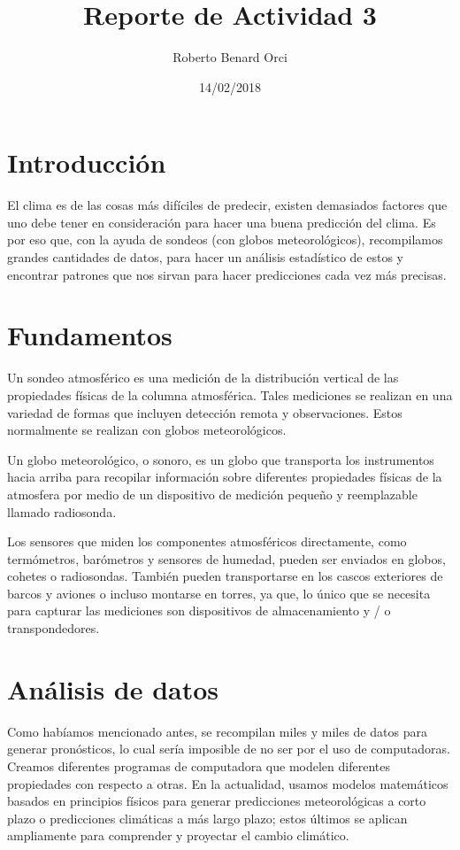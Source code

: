 \documentclass{article}
\title{Reporte de Actividad 3}
\author{Roberto Benard Orci}
\date{14/02/2018}
\begin{document}
\maketitle

\section{Introducción}
El clima es de las cosas más difíciles de predecir, existen demasiados factores que uno debe tener en consideración para hacer una buena predicción del clima. Es por eso que, con la ayuda de sondeos (con globos meteorológicos), recompilamos grandes cantidades de datos, para hacer un análisis estadístico de estos y encontrar patrones que nos sirvan para hacer predicciones cada vez más precisas.

\section{Fundamentos}

Un sondeo atmosférico es una medición de la distribución vertical de las propiedades físicas de la columna atmosférica. Tales mediciones se realizan en una variedad de formas que incluyen detección remota y observaciones. Estos normalmente se realizan con globos meteorológicos.

Un globo meteorológico, o sonoro, es un globo que transporta los instrumentos hacia arriba para recopilar información sobre diferentes propiedades físicas de la atmosfera por medio de un dispositivo de medición pequeño y reemplazable llamado radiosonda. 

Los sensores que miden los componentes atmosféricos directamente, como termómetros, barómetros y sensores de humedad, pueden ser enviados en globos, cohetes o radiosondas. También pueden transportarse en los cascos exteriores de barcos y aviones o incluso montarse en torres, ya que, lo único que se necesita para capturar las mediciones son dispositivos de almacenamiento y / o transpondedores.


\section{Análisis de datos}

Como habíamos mencionado antes, se recompilan miles y miles de datos para generar pronósticos, lo cual sería imposible de no ser por el uso de computadoras. Creamos diferentes programas de computadora que modelen diferentes propiedades con respecto a otras. En la actualidad, usamos modelos matemáticos basados en principios físicos para generar predicciones meteorológicas a corto plazo o predicciones climáticas a más largo plazo; estos últimos se aplican ampliamente para comprender y proyectar el cambio climático.
\end{document}
